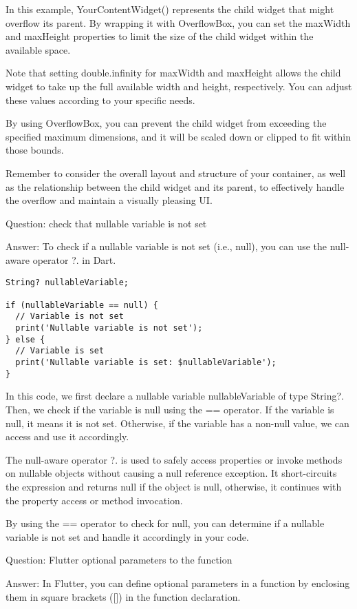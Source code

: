 In this example, YourContentWidget() represents the child widget that might overflow its parent. By wrapping it with 
OverflowBox, you can set the maxWidth and maxHeight properties to limit the size of the child widget within the 
available space.

Note that setting double.infinity for maxWidth and maxHeight allows the child widget to take up the full available 
width and height, respectively. You can adjust these values according to your specific needs.

By using OverflowBox, you can prevent the child widget from exceeding the specified maximum dimensions, and it will 
be scaled down or clipped to fit within those bounds.

Remember to consider the overall layout and structure of your container, as well as the relationship between the child 
widget and its parent, to effectively handle the overflow and maintain a visually pleasing UI.


Question: check that nullable variable is not set

Answer: To check if a nullable variable is not set (i.e., null), you can use the null-aware operator ?. in Dart. 

\begin{lstlisting}
String? nullableVariable;

if (nullableVariable == null) {
  // Variable is not set
  print('Nullable variable is not set');
} else {
  // Variable is set
  print('Nullable variable is set: $nullableVariable');
}
\end{lstlisting}

In this code, we first declare a nullable variable nullableVariable of type String?. Then, we check if the variable 
is null using the == operator. If the variable is null, it means it is not set. Otherwise, if the variable has a 
non-null value, we can access and use it accordingly.

The null-aware operator ?. is used to safely access properties or invoke methods on nullable objects without causing 
a null reference exception. It short-circuits the expression and returns null if the object is null, otherwise, it 
continues with the property access or method invocation.

By using the == operator to check for null, you can determine if a nullable variable is not set and handle it 
accordingly in your code.


Question: Flutter optional parameters to the function

Answer: In Flutter, you can define optional parameters in a function by enclosing them in square brackets 
([]) in the function declaration. 

